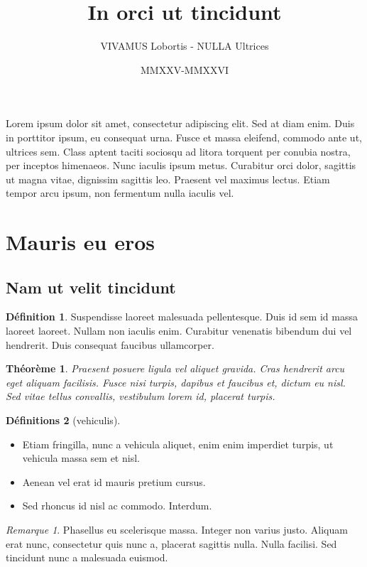 \documentclass[10pt,a4paper]{article}
\title{In orci ut tincidunt}
\author{VIVAMUS Lobortis - NULLA Ultrices}
\date{MMXXV-MMXXVI}
\title{\bfseries\huge\thetitle}
\newtheorem{theoreme}{Théorème}
\theoremstyle{definition}
\newtheorem{definition}{Définition}
\newtheorem{definitions}[definition]{Définitions}
\theoremstyle{remark}
\newtheorem{remarque}{Remarque}
\begin{document}
 
\begin{introduction}
    Lorem ipsum dolor sit amet, consectetur adipiscing elit. Sed at diam enim. Duis in porttitor ipsum, eu consequat urna. Fusce et massa eleifend, commodo ante ut, ultrices sem. Class aptent taciti sociosqu ad litora torquent per conubia nostra, per inceptos himenaeos. Nunc iaculis ipsum metus. Curabitur orci dolor, sagittis ut magna vitae, dignissim sagittis leo. Praesent vel maximus lectus. Etiam tempor arcu ipsum, non fermentum nulla iaculis vel.
\end{introduction}

\tableofcontents
\vspace{10pt}

\section{Mauris eu eros}
\subsection{Nam ut velit tincidunt}

\begin{definition}
    Suspendisse laoreet malesuada pellentesque. Duis id sem id massa laoreet laoreet. Nullam non iaculis enim. Curabitur venenatis bibendum dui vel hendrerit. Duis consequat faucibus ullamcorper.  
\end{definition}

\begin{theoreme}
    Praesent posuere ligula vel aliquet gravida. Cras hendrerit arcu eget aliquam facilisis. Fusce nisi turpis, dapibus et faucibus et, dictum eu nisl. Sed vitae tellus convallis, vestibulum lorem id, placerat turpis.
\end{theoreme}

\begin{definitions}[vehiculis]
    \hspace{0pt}
    \begin{itemize}
        \item Etiam fringilla, nunc a vehicula aliquet, enim enim imperdiet turpis, ut vehicula massa sem et nisl. 
        \item Aenean vel erat id mauris pretium cursus. 
        \item Sed rhoncus id nisl ac commodo. Interdum. 
    \end{itemize}
\end{definitions}

\begin{remarque}
    Phasellus eu scelerisque massa. Integer non varius justo. Aliquam erat nunc, consectetur quis nunc a, placerat sagittis nulla. Nulla facilisi. Sed tincidunt nunc a malesuada euismod. 
\end{remarque}
\end{document}
